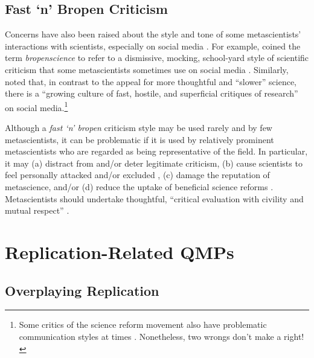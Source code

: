\documentclass[authordate, meta]{jote-new-article}
\begin{document}
\subsection{Fast ‘n’ Bropen Criticism}



Concerns have also been raised about the style and tone of some metascientists’ interactions with scientists, especially on social media \parencites[e.g.,][]{Fiske2016}[p. 692]{Hamlin2017}{Pownall2022a}{Whitaker2020}. For example, \textcite{Whitaker2020} coined the term \emph{bropenscience} to refer to a dismissive, mocking, school-yard style of scientific criticism that some metascientists sometimes use on social media \parencites[e.g.,][]{Anonymous2021}[see also][]{Derksen2022}[pp. 529-530]{Pownall2021}. Similarly, \textcite{Pownall2022} noted that, in contrast to the appeal for more thoughtful and “slower” science, there is a “growing culture of fast, hostile, and superficial critiques of research” on social media.\footnote{Some critics of the science reform movement also have problematic communication styles at times \parencites[for some examples, see][]{Holcombe2021}. Nonetheless, two wrongs don’t make a right!}



Although a \emph{fast ‘n’ bropen} criticism style may be used rarely and by few metascientists, it can be problematic if it is used by relatively prominent metascientists who are regarded as being representative of the field. In particular, it may (a) distract from and/or deter legitimate criticism, (b) cause scientists to feel personally attacked and/or excluded \parencites[e.g.,][]{Derksen2022}[p. 692]{Hamlin2017}{Pownall2021}, (c) damage the reputation of metascience, and/or (d) reduce the uptake of beneficial science reforms \parencite{Gervais2021}. Metascientists should undertake thoughtful, “critical evaluation with civility and mutual respect” \parencite{bib118}.



\section{Replication-Related QMPs}



\subsection{Overplaying Replication}
\end{document}
